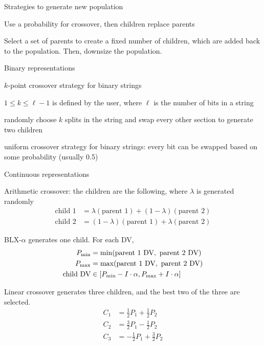 \documentclass{article}
\begin{document}
\begin{itemize*}
\item Strategies to generate new population
  \begin{itemize*}
  \item Use a probability for crossover, then children replace parents
  \item Select a set of parents to create a fixed number of children, which are
    added back to the population. Then, downsize the population.
  \end{itemize*}
\item Binary representations
  \begin{itemize*}
  \item \(k\)-point crossover strategy for binary strings
    \begin{itemize*}
    \item \(1 \le k \le \ell - 1\) is defined by the user, where \(\ell\) is the number of bits in a string
    \item randomly choose \(k\) splits in the string and swap every other section to generate two children
    \end{itemize*}
  \item uniform crossover strategy for binary strings: every bit can be swapped based on some probability (usually 0.5)
  \end{itemize*}
\item Continuous representations
  \begin{itemize*}
  \item Arithmetic crossover: the children are the following, where \(\lambda\) is generated randomly
    \begin{align*}
      \text{child 1} &= \lambda(\text{parent 1}) + (1 - \lambda)(\text{parent 2}) \\
      \text{child 2} &= (1 - \lambda)(\text{parent 1}) + \lambda(\text{parent 2})
    \end{align*}
  \item BLX-\(\alpha\) generates one child. For each DV,
    \begin{align*}
      P_{\mathrm{min}} &= \min(\text{parent 1 DV},\ \text{parent 2 DV}) \\
      P_{\mathrm{max}} &= \max(\text{parent 1 DV},\ \text{parent 2 DV}) \\
      \text{child DV} &\in \left[P_{\mathrm{min}} - I\cdot\alpha, P_{\mathrm{max}} + I\cdot\alpha\right]
    \end{align*}
  \item Linear crossover generates three children, and the best two of the three are selected.
    \begin{align*}
      C_1 &= \tfrac12 P_1 + \tfrac12 P_2 \\
      C_2 &= \tfrac32 P_1 - \tfrac12 P_2 \\
      C_3 &= -\tfrac12 P_1 + \tfrac32 P_2
    \end{align*}
  \end{itemize*}
\end{itemize*}
\end{document}
